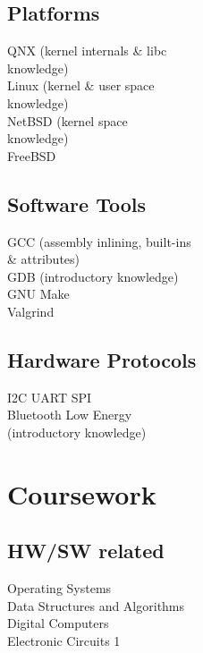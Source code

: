 \documentclass[letterpaper, 10pt]{deedy-resume} %
\begin{document}
{\begin{minipage}[t]{0.30\textwidth}
\sectionspace
\sectionspace

\subsection{Platforms}
\textbullet{} QNX (kernel internals \& libc \\
\hspace{2.5mm} knowledge) \\
\textbullet{} Linux (kernel \& user space \\
\hspace{2.5mm} knowledge) \\
\textbullet{} NetBSD (kernel space \\
\hspace{2.5mm} knowledge) \\
\textbullet{} FreeBSD \\
\sectionspace %
\sectionspace
\subsection{Software Tools}
\textbullet{} GCC (assembly inlining, built-ins \\
\hspace{2.5mm} \& attributes) \\ 
\textbullet{} GDB (introductory knowledge)\\
\textbullet{} GNU Make \\
\textbullet{} Valgrind 

\sectionspace %
\sectionspace
\subsection{Hardware Protocols}

\textbullet{} I2C \textbullet{} UART \textbullet{} SPI \\
\textbullet{} Bluetooth Low Energy \\ 
\hspace{2.5mm} (introductory knowledge) \\
\sectionspace %


\section{Coursework}
\subsection{HW/SW related}
\textbullet{} Operating Systems \\
\textbullet{} Data Structures and Algorithms \\
\textbullet{} Digital Computers \\
\textbullet{} Electronic Circuits 1\\
\sectionspace %


\end{minipage}}
\end{document}
